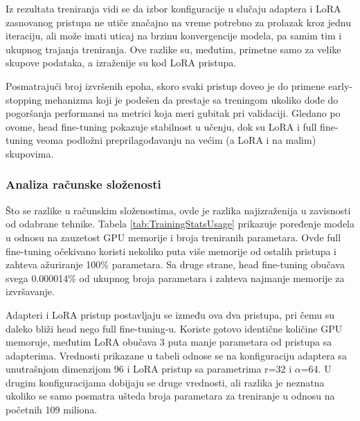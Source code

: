 \documentclass[12pt,oneside]{memoir}
\begin{document}
Iz rezultata treniranja vidi se da izbor konfiguracije u slučaju adaptera i LoRA zasnovanog pristupa ne utiče značajno na vreme potrebno za prolazak kroz jednu iteraciju, ali može imati uticaj na brzinu konvergencije modela, pa samim tim i ukupnog trajanja treniranja.
Ove razlike su, međutim, primetne samo za velike skupove podataka, a izraženije su kod LoRA pristupa.

Posmatrajući broj izvršenih epoha, skoro svaki pristup doveo je do primene early-stopping mehanizma koji je podešen da prestaje sa treningom ukoliko dođe do pogoršanja performansi na metrici koja meri gubitak pri validaciji. Gledano po ovome, head fine-tuning pokazuje stabilnost u učenju, dok su LoRA i full fine-tuning veoma podložni preprilagođavanju na većim (a LoRA i na malim) skupovima.


\subsubsection{Analiza računske složenosti}

Što se razlike u računskim složenostima, ovde je razlika najizraženija u zavisnosti od odabrane tehnike. Tabela \ref{tab:TrainingStatsUsage} prikazuje poređenje modela u odnosu na zauzetost GPU memorije i broja treniranih parametara. Ovde full fine-tuning očekivano koristi nekoliko puta više memorije od ostalih pristupa i zahteva ažuriranje 100\% parametara. Sa druge strane, head fine-tuning obučava svega 0.000014\% od ukupnog broja parametara i zahteva najmanje memorije za izvršavanje. 

Adapteri i LoRA pristup postavljaju se između ova dva pristupa, pri čemu su daleko bliži head nego full fine-tuning-u. Koriste gotovo identične količine GPU memoruje, međutim LoRA obučava 3 puta manje parametara od pristupa sa adapterima. Vrednosti prikazane u tabeli odnose se na konfiguraciju adaptera sa unutrašnjom dimenzijom 96 i LoRA pristup sa parametrima r=32 i \(\alpha\)=64. U drugim konfiguracijama dobijaju se druge vrednosti, ali razlika je neznatna ukoliko se samo posmatra ušteda broja parametara za treniranje u odnosu na početnih 109 miliona.
\end{document}
